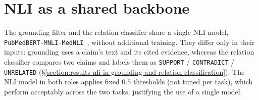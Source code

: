 \section{NLI as a shared backbone}\label{section:disc-nli-as-shared-backbone}

The grounding filter and the relation classifier share a single NLI model, \texttt{PubMedBERT-MNLI-MedNLI}~\parencite{deka2023pubmedbertextended}, without additional training. They differ only in their inputs: grounding uses a claim's text and its cited evidence, whereas the relation classifier compares two claims and labels them as \texttt{SUPPORT} / \texttt{CONTRADICT} / \texttt{UNRELATED} (§\ref{section:results-nli-in-grounding-and-relation-classification}). The NLI model in both roles applies fixed $0.5$ thresholds (not tuned per task), which perform acceptably across the two tasks, justifying the use of a single model.

